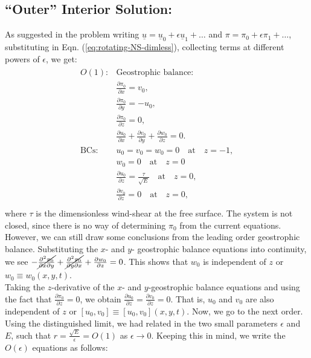 \documentclass{article}
\newcommand{\pd}[2]{\frac{\partial{#1}}{\partial{#2}}}
\newcommand{\pddmixed}[3]{\frac{\partial^2{#1}}{\partial{#2}\partial{#3}}}
\begin{document}
\subsection{``Outer'' Interior Solution:}
As suggested in the problem writing $\underline{u} = \underline{u}_{0} + \epsilon \underline{u}_{1} + \hdots$ and $\pi = \pi_{0} + \epsilon \pi_{1} + \hdots$, substituting in Eqn. (\ref{eq:rotating-NS-dimless}), collecting terms at different powers of $\epsilon$, we get:
\begin{align}\label{eq:order-1-outer}
 \begin{split}
 O(1):& \textrm{Geostrophic balance:} \\
 & \pd{\pi_{0}}{x} = v_{0}, \\
 & \pd{\pi_{0}}{y} = -u_{0}, \\
 & \pd{\pi_{0}}{z} = 0,\\
 & \pd{u_{0}}{x} + \pd{v_{0}}{y} + \pd{w_{0}}{z} = 0.\\
 \textrm{BCs}:& u_{0} = v_{0} = w_{0} = 0 \quad \textrm{at} \quad z = -1, \\
 & w_{0} = 0 \quad \textrm{at} \quad z = 0 \\
 & \pd{u_{0}}{z} = \frac{\tau}{\sqrt{E}} \quad \textrm{at} \quad z = 0, \\
 & \pd{v_{0}}{z} = 0 \quad \textrm{at} \quad z = 0, \\
 \end{split}
\end{align}
where $\tau$ is the dimensionless wind-shear at the free surface. The system is not closed, since there is no way of determining $\pi_{0}$ from the current equations. However, we can still draw some conclusions from the leading order geostrophic balance. Substituting the $x$- and $y$- geostrophic balance equations into continuity, we see $-\cancel{\pddmixed{\pi_{0}}{x}{y}} + \cancel{\pddmixed{\pi_{0}}{y}{x}} + \pd{w_{0}}{z} = 0$. This shows that $w_{0}$ is independent of $z$ or $\boxed{w_{0}\equiv w_{0}(x, y, t)}$.\\
%
Taking the $z$-derivative of the $x$- and $y$-geostrophic balance equations and using the fact that $\pd{\pi_{0}}{z} = 0$, we obtain $\pd{u_{0}}{z} = \pd{v_{0}}{z} = 0$. That is, $u_{0}$ and $v_{0}$ are also independent of $z$ or  $\boxed{[u_{0}, v_{0}]\equiv [u_{0}, v_{0}](x, y, t)}$. Now, we go to the next order. Using the distinguished limit, we had related in the two small parameters $\epsilon$ and $E$, such that $ r = \frac{\sqrt{E}}{\epsilon} = O(1)$ as $\epsilon \rightarrow 0$. Keeping this in mind, we write the $O(\epsilon)$ equations as follows:
\end{document}
